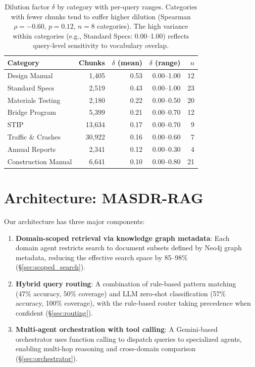 \documentclass{article}
\newcommand{\systemname}{\textsc{MASDR-RAG}}
\begin{document}
\begin{table}[H]
\centering
\footnotesize
\begin{tabular}{l r r r r}
\toprule
\textbf{Category} & \textbf{Chunks} & \textbf{$\delta$ (mean)} & \textbf{$\delta$ (range)} & \textbf{$n$} \\
\midrule
Design Manual       & 1,405  & 0.53 & 0.00--1.00 & 12 \\
Standard Specs      & 2,519  & 0.43 & 0.00--1.00 & 23 \\
Materials Testing   & 2,180  & 0.22 & 0.00--0.50 & 20 \\
Bridge Program      & 5,399  & 0.21 & 0.00--0.70 & 12 \\
STIP                & 13,634 & 0.17 & 0.00--0.70 & 9 \\
Traffic \& Crashes  & 30,922 & 0.16 & 0.00--0.60 & 7 \\
Annual Reports      & 2,341  & 0.12 & 0.00--0.30 & 4 \\
Construction Manual & 6,641  & 0.10 & 0.00--0.80 & 21 \\
\bottomrule
\end{tabular}
\caption{Dilution factor $\delta$ by category with per-query ranges. Categories with fewer chunks tend to suffer higher dilution (Spearman $\rho=-0.60$, $p=0.12$, $n=8$ categories). The high variance within categories (e.g., Standard Specs: 0.00--1.00) reflects query-level sensitivity to vocabulary overlap.}
\label{tab:dilution}
\end{table}




\section{Architecture: \systemname{}}
\label{sec:architecture}

Our architecture has three major components:

\begin{enumerate}[leftmargin=*,topsep=2pt,itemsep=1pt]
    \item \textbf{Domain-scoped retrieval via knowledge graph metadata}: Each domain agent restricts search to document subsets defined by Neo4j graph metadata, reducing the effective search space by 85--98\% (\S\ref{sec:scoped_search}).
    \item \textbf{Hybrid query routing}: A combination of rule-based pattern matching (47\% accuracy, 50\% coverage) and LLM zero-shot classification (57\% accuracy, 100\% coverage), with the rule-based router taking precedence when confident (\S\ref{sec:routing}).
    \item \textbf{Multi-agent orchestration with tool calling}: A Gemini-based orchestrator uses function calling to dispatch queries to specialized agents, enabling multi-hop reasoning and cross-domain comparison (\S\ref{sec:orchestrator}).
\end{enumerate}
\end{document}

